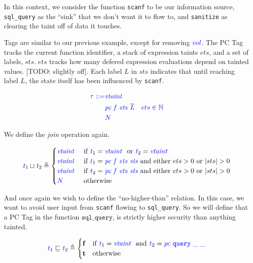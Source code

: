 \documentclass{llncs}
\begin{document}
In this context, we consider the function {\tt scanf} to be our information source,
{\tt sql\_query} as the ``sink'' that we don't want it to flow to, and {\tt sanitize} as
clearing the taint off of data it touches.

Tags are similar to our previous example, except for removing \(\mathit{\color{blue} vol}\). The PC Tag tracks the current function
identifier, a stack of expression taints \(ets\), and a set of labels, \(sts\).
\(ets\) tracks how many defered expression evaluations depend on tainted values. [TODO: slightly off].
Each label \(L\) in \(sts\) indicates that until reaching label \(L\), the state itself has been
influenced by {\tt scanf}.

\[\color{blue}
\begin{aligned}
  \tau ::= & \mathit{\color{blue} vtaint ~ } \\
  & \mathit{\color{blue} pc ~ f ~ ets ~ \overline{L}} & ets \in \mathbb{N} \\
  & {\color{blue} N} \\
\end{aligned}\]

We define the {\em join} operation again.

\[\mathit{\color{blue} t}_1 \sqcup \mathit{\color{blue} t}_2 \triangleq
\begin{cases}
  \mathit{\color{blue} vtaint ~ } &
  \textnormal{if } \mathit{\color{blue} t}_1 = \mathit{\color{blue} vtaint ~ } \textnormal{ or }
  \mathit{\color{blue} t}_2 = \mathit{\color{blue} vtaint ~ } \\
  \mathit{\color{blue} vtaint ~ } &
  \textnormal{if } \mathit{\color{blue} t}_1 = \mathit{\color{blue} pc ~ f ~ ets ~ sts} \textnormal{ and either }
  ets > 0 \textnormal{ or } |sts| > 0\\
  \mathit{\color{blue} vtaint ~ } &
  \textnormal{if } \mathit{\color{blue} t}_2 = \mathit{\color{blue} pc ~ f ~ ets ~ sts} \textnormal{ and either }
  ets > 0 \textnormal{ or } |sts| > 0\\
  {\color{blue} N} & \textnormal{otherwise} \\
\end{cases}\]
%

And once again we wish to define the ``no-higher-than'' relation. In this case,
we want to avoid user input from {\tt scanf} flowing to {\tt sql\_query}.
So we will define that a PC Tag in the function \(\mathtt{sql\_query}\), is strictly
higher security than anything tainted.

\[\mathit{\color{blue} t}_1 \sqsubseteq \mathit{\color{blue} t}_2 \triangleq
\begin{cases}
  \mathbf{f} & \textnormal{if } \mathit{\color{blue} t}_1 = \mathit{\color{blue} vtaint ~ }
  \textnormal{ and } \mathit{\color{blue} t}_2 = \mathit{\color{blue} pc ~ \mathtt{query} ~ \_ ~ \_} \\
  \mathbf{t} & \textnormal{otherwise} \\
\end{cases}\]
\end{document}
